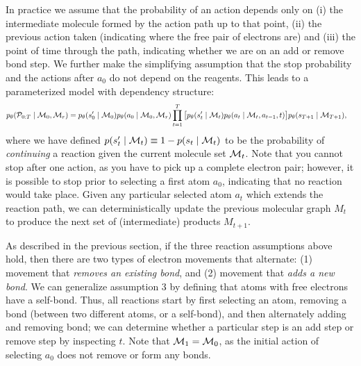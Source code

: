 In practice we assume that the probability of an action depends only on (i) the intermediate molecule formed by the action path up to that point, (ii) the previous action taken (indicating where the free pair of electrons are) and (iii) the point of time through the path, indicating whether we are on an add or remove bond step. 
We further make the simplifying assumption that the stop probability and the actions after $a_0$ do not depend on the reagents. This leads to a parameterized model with dependency structure:
\begin{align}
p_\theta({\mathcal{P}}_{0:T} \mid {\mathcal{M}}_0, {\mathcal{M}}_r) 
&=
	   p_\theta(s'_0 \mid {\mathcal{M}}_0)
       p_\theta(a_0 \mid {\mathcal{M}}_0, {\mathcal{M}}_r)
\prod_{t=1}^{T}
	\big[ 
		p_\theta(s_{t}' \mid {\mathcal{M}}_{t})
		p_\theta(a_t \mid {\mathcal{M}}_{t}, a_{t-1}, t)
	\big]
	p_\theta(s_{T+1} \mid {\mathcal{M}}_{T+1})
	,
\label{eq:jointprob}
\end{align}
where we have defined $p(s'_t \mid {\mathcal{M}}_t) \equiv 1 - p(s_t \mid {\mathcal{M}}_t)$ to be the probability of {\em continuing} a reaction given the current molecule set ${\mathcal{M}}_t$.
%
%
%
Note that you cannot stop after one action, as you have to pick up a complete electron pair;
however, it is possible to stop prior to selecting a first atom $a_0$, indicating that no reaction would take place.
Given any particular selected atom $a_t$ which extends the reaction path, we can deterministically update the previous molecular graph $M_{t}$ to produce the next set of (intermediate) products $M_{t+1}$.

As described in the previous section, if the three reaction assumptions above hold, then there are two types of electron movements that alternate: 
(1) movement that \emph{removes an existing bond}, and 
(2) movement that \emph{adds a new bond}. 
We can generalize assumption 3 by defining that atoms with free electrons have a self-bond. 
Thus, all reactions start by first selecting an atom, removing a bond (between two different atoms, or a self-bond), and then alternately adding and removing bond;
we can determine whether a particular step is an add step or remove step by inspecting $t$.
Note that ${\mathcal{M}}_1 = {\mathcal{M}}_0$, as the initial action of selecting $a_0$ does not remove or form any bonds.

